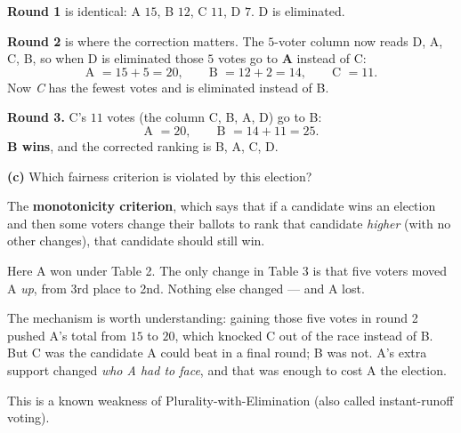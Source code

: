 \documentclass[12pt]{ximera}
\begin{document}
\begin{problem}
\begin{prompt}
\begin{feedback}
\textbf{Round 1} is identical: A $15$, B $12$, C $11$, D $7$. D is eliminated.

\textbf{Round 2} is where the correction matters. The $5$-voter column now reads
D, A, C, B, so when D is eliminated those $5$ votes go to \textbf{A} instead of C:
\[ \text{A } = 15+5 = 20, \qquad \text{B } = 12+2 = 14, \qquad \text{C } = 11. \]
Now \emph{C} has the fewest votes and is eliminated instead of B.

\textbf{Round 3.} C's $11$ votes (the column C, B, A, D) go to B:
\[ \text{A } = 20, \qquad \text{B } = 14+11 = 25. \]
\textbf{B wins}, and the corrected ranking is B, A, C, D.
\end{feedback}
\end{prompt}

\begin{prompt}
\textbf{(c)} Which fairness criterion is violated by this election?

\begin{multipleChoice}
\end{multipleChoice}

\begin{feedback}
The \textbf{monotonicity criterion}, which says that if a candidate wins an election
and then some voters change their ballots to rank that candidate \emph{higher} (with
no other changes), that candidate should still win.

Here A won under Table 2. The only change in Table 3 is that five voters moved A
\emph{up}, from 3rd place to 2nd. Nothing else changed --- and A lost.

The mechanism is worth understanding: gaining those five votes in round 2 pushed A's
total from $15$ to $20$, which knocked C out of the race instead of B. But C was the
candidate A could beat in a final round; B was not. A's extra support changed
\emph{who A had to face}, and that was enough to cost A the election.

This is a known weakness of Plurality-with-Elimination (also called instant-runoff
voting).
\end{feedback}
\end{prompt}
\end{problem}
\end{document}
